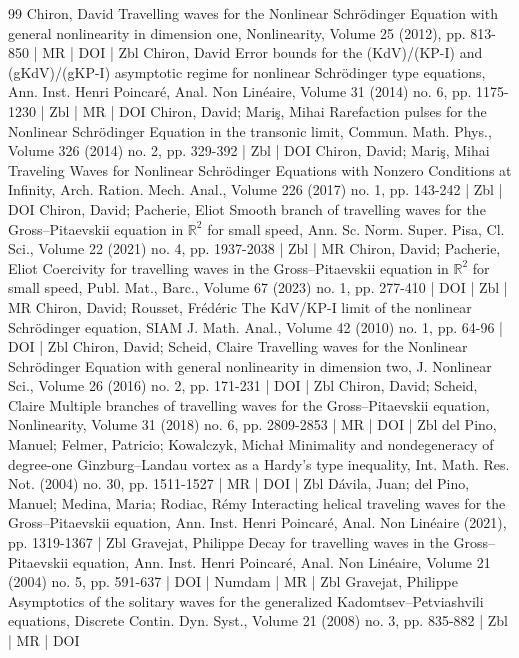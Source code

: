 \documentclass[10pt]{amsart}
\theoremstyle{definition}\newtheorem{defi}[theo]{Definition}\newtheorem{rema}[theo]{Remark}\newtheorem{exam}[theo]{Example}\newtheorem{exem}[theo]{Example}\newtheorem{nota}[theo]{Notation}
\begin{document}
\begin{thebibliography}{99}
Chiron, David Travelling waves for the Nonlinear Schrödinger Equation with general nonlinearity in dimension one, Nonlinearity, Volume 25 (2012), pp. 813-850 | MR | DOI | Zbl
Chiron, David Error bounds for the (KdV)/(KP-I) and (gKdV)/(gKP-I) asymptotic regime for nonlinear Schrödinger type equations, Ann. Inst. Henri Poincaré, Anal. Non Linéaire, Volume 31 (2014) no. 6, pp. 1175-1230 | Zbl | MR | DOI
Chiron, David; Mariş, Mihai Rarefaction pulses for the Nonlinear Schrödinger Equation in the transonic limit, Commun. Math. Phys., Volume 326 (2014) no. 2, pp. 329-392 | Zbl | DOI
Chiron, David; Mariş, Mihai Traveling Waves for Nonlinear Schrödinger Equations with Nonzero Conditions at Infinity, Arch. Ration. Mech. Anal., Volume 226 (2017) no. 1, pp. 143-242 | Zbl | DOI
Chiron, David; Pacherie, Eliot Smooth branch of travelling waves for the Gross–Pitaevskii equation in $\mathbb{R}^2$ for small speed, Ann. Sc. Norm. Super. Pisa, Cl. Sci., Volume 22 (2021) no. 4, pp. 1937-2038 | Zbl | MR
Chiron, David; Pacherie, Eliot Coercivity for travelling waves in the Gross–Pitaevskii equation in $\mathbb{R}^2$ for small speed, Publ. Mat., Barc., Volume 67 (2023) no. 1, pp. 277-410 | DOI | Zbl | MR
Chiron, David; Rousset, Frédéric The KdV/KP-I limit of the nonlinear Schrödinger equation, SIAM J. Math. Anal., Volume 42 (2010) no. 1, pp. 64-96 | DOI | Zbl
Chiron, David; Scheid, Claire Travelling waves for the Nonlinear Schrödinger Equation with general nonlinearity in dimension two, J. Nonlinear Sci., Volume 26 (2016) no. 2, pp. 171-231 | DOI | Zbl
Chiron, David; Scheid, Claire Multiple branches of travelling waves for the Gross–Pitaevskii equation, Nonlinearity, Volume 31 (2018) no. 6, pp. 2809-2853 | MR | DOI | Zbl
del Pino, Manuel; Felmer, Patricio; Kowalczyk, Michał Minimality and nondegeneracy of degree-one Ginzburg–Landau vortex as a Hardy’s type inequality, Int. Math. Res. Not. (2004) no. 30, pp. 1511-1527 | MR | DOI | Zbl
Dávila, Juan; del Pino, Manuel; Medina, Maria; Rodiac, Rémy Interacting helical traveling waves for the Gross–Pitaevskii equation, Ann. Inst. Henri Poincaré, Anal. Non Linéaire (2021), pp. 1319-1367 | Zbl
Gravejat, Philippe Decay for travelling waves in the Gross–Pitaevskii equation, Ann. Inst. Henri Poincaré, Anal. Non Linéaire, Volume 21 (2004) no. 5, pp. 591-637 | DOI | Numdam | MR | Zbl
Gravejat, Philippe Asymptotics of the solitary waves for the generalized Kadomtsev–Petviashvili equations, Discrete Contin. Dyn. Syst., Volume 21 (2008) no. 3, pp. 835-882 | Zbl | MR | DOI

\end{thebibliography}
\end{document}
